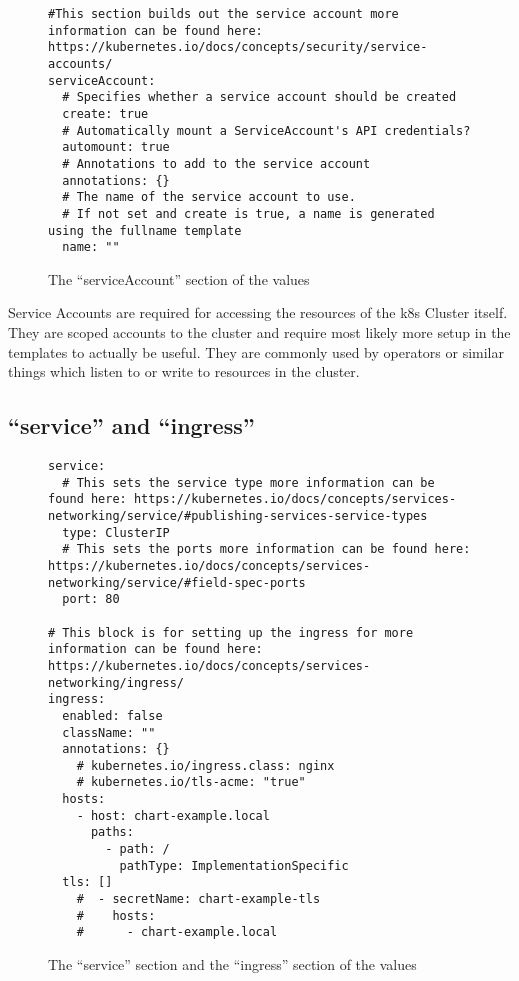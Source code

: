 \documentclass[english]{scrbook}
\begin{document}
\begin{figure}[!hp]
\centering
\begin{singlespace}
\begin{verbatim}
#This section builds out the service account more information can be found here: https://kubernetes.io/docs/concepts/security/service-accounts/
serviceAccount:
  # Specifies whether a service account should be created
  create: true
  # Automatically mount a ServiceAccount's API credentials?
  automount: true
  # Annotations to add to the service account
  annotations: {}
  # The name of the service account to use.
  # If not set and create is true, a name is generated using the fullname template
  name: ""
\end{verbatim}
\end{singlespace}
\caption{The \enquote{serviceAccount} section of the \gls{values}}\label{code:service_account_section}
\end{figure}

Service Accounts are required for accessing the resources of the \gls{k8s} Cluster itself.
They are scoped accounts to the cluster and require most likely more setup in the templates to actually be useful.
They are commonly used by operators or similar things which listen to or write to resources in the cluster.

\subsection{\enquote{service} and \enquote{ingress}}

\begin{figure}[!hp]
\centering
\begin{singlespace}
\begin{verbatim}
service:
  # This sets the service type more information can be found here: https://kubernetes.io/docs/concepts/services-networking/service/#publishing-services-service-types
  type: ClusterIP
  # This sets the ports more information can be found here: https://kubernetes.io/docs/concepts/services-networking/service/#field-spec-ports
  port: 80

# This block is for setting up the ingress for more information can be found here: https://kubernetes.io/docs/concepts/services-networking/ingress/
ingress:
  enabled: false
  className: ""
  annotations: {}
    # kubernetes.io/ingress.class: nginx
    # kubernetes.io/tls-acme: "true"
  hosts:
    - host: chart-example.local
      paths:
        - path: /
          pathType: ImplementationSpecific
  tls: []
    #  - secretName: chart-example-tls
    #    hosts:
    #      - chart-example.local
\end{verbatim}
\end{singlespace}
\caption{The \enquote{service} section and the \enquote{ingress} section of the \gls{values}}\label{code:service_and_ingress_section}
\end{figure}
\end{document}
